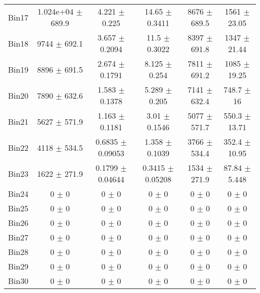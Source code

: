 \begin{tabular}{@{\extracolsep{4pt}}lccccc@{}}
     Bin17 & 1.024e+04 $\pm$ 689.9 & 4.221 $\pm$ 0.225 & 14.65 $\pm$ 0.3411 & 8676 $\pm$ 689.5 & 1561 $\pm$ 23.05 \\ 
     Bin18 & 9744 $\pm$ 692.1 & 3.657 $\pm$ 0.2094 & 11.5 $\pm$ 0.3022 & 8397 $\pm$ 691.8 & 1347 $\pm$ 21.44 \\ 
     Bin19 & 8896 $\pm$ 691.5 & 2.674 $\pm$ 0.1791 & 8.125 $\pm$ 0.254 & 7811 $\pm$ 691.2 & 1085 $\pm$ 19.25 \\ 
     Bin20 & 7890 $\pm$ 632.6 & 1.583 $\pm$ 0.1378 & 5.289 $\pm$ 0.205 & 7141 $\pm$ 632.4 & 748.7 $\pm$ 16 \\ 
     Bin21 & 5627 $\pm$ 571.9 & 1.163 $\pm$ 0.1181 & 3.01 $\pm$ 0.1546 & 5077 $\pm$ 571.7 & 550.3 $\pm$ 13.71 \\ 
     Bin22 & 4118 $\pm$ 534.5 & 0.6835 $\pm$ 0.09053 & 1.358 $\pm$ 0.1039 & 3766 $\pm$ 534.4 & 352.4 $\pm$ 10.95 \\ 
     Bin23 & 1622 $\pm$ 271.9 & 0.1799 $\pm$ 0.04644 & 0.3415 $\pm$ 0.05208 & 1534 $\pm$ 271.9 & 87.84 $\pm$ 5.448 \\ 
     Bin24 & 0 $\pm$ 0 & 0 $\pm$ 0 & 0 $\pm$ 0 & 0 $\pm$ 0 & 0 $\pm$ 0 \\ 
     Bin25 & 0 $\pm$ 0 & 0 $\pm$ 0 & 0 $\pm$ 0 & 0 $\pm$ 0 & 0 $\pm$ 0 \\ 
     Bin26 & 0 $\pm$ 0 & 0 $\pm$ 0 & 0 $\pm$ 0 & 0 $\pm$ 0 & 0 $\pm$ 0 \\ 
     Bin27 & 0 $\pm$ 0 & 0 $\pm$ 0 & 0 $\pm$ 0 & 0 $\pm$ 0 & 0 $\pm$ 0 \\ 
     Bin28 & 0 $\pm$ 0 & 0 $\pm$ 0 & 0 $\pm$ 0 & 0 $\pm$ 0 & 0 $\pm$ 0 \\ 
     Bin29 & 0 $\pm$ 0 & 0 $\pm$ 0 & 0 $\pm$ 0 & 0 $\pm$ 0 & 0 $\pm$ 0 \\ 
     Bin30 & 0 $\pm$ 0 & 0 $\pm$ 0 & 0 $\pm$ 0 & 0 $\pm$ 0 & 0 $\pm$ 0 \\ 
\hline\hline
  \end{tabular}
